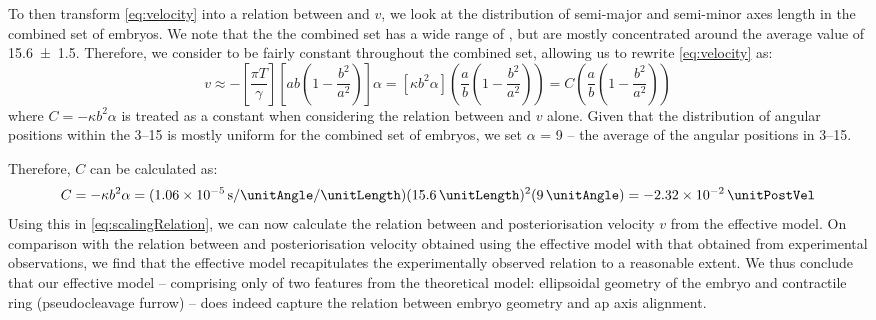 To then transform \eqref{eq:velocity} into a relation between \aspectRatio and $v$, we look at the distribution of semi-major \longAxisLength and semi-minor \shortAxisLength axes length in the combined set of embryos. We note that the the combined set has a wide range of \longAxisLength, but \shortAxisLength are mostly concentrated around the average value of \SI{15.6 +- 1.5}{\unitLength}. Therefore, we consider \shortAxisLength to be fairly constant throughout the combined set, allowing us to rewrite \eqref{eq:velocity} as:
\begin{equation} \label{eq:scalingRelation}
    v \approx - \left[\frac{\pi T}{\gamma}\right] \left[ab\left(1 - \frac{b^2}{a^2}\right)\right]\alpha = [\kappa b^2 \alpha] \left(\frac{a}{b}\left(1 - \frac{b^2}{a^2}\right)\right) = C \left(\frac{a}{b}\left(1 - \frac{b^2}{a^2}\right)\right)
\end{equation}
where $C = -\kappa b^2 \alpha$ is treated as a constant when considering the relation between \aspectRatio and $v$ alone. Given that the distribution of angular positions within the \SIrange{3}{15}{\unitAngle} is mostly uniform for the combined set of embryos, we set $\alpha$ = \SI{9}{\unitAngle} -- the average of the angular positions in \SIrange{3}{15}{\unitAngle}.

Therefore, $C$ can be calculated as:
\begin{equation} \label{eq:scalingConst}
    C = -\kappa b^2 \alpha = (\SI{1.06e-5}{\per\second\per\unitAngle\per\unitLength}) (\SI{15.6}{\unitLength})^2 (\SI{9}{\unitAngle}) = \SI{-2.32e-2}{\unitPostVel}
\end{equation}
Using this in \autoref{eq:scalingRelation}, we can now calculate the relation between \aspectRatio and posteriorisation velocity $v$ from the effective model. On comparison with the relation between \aspectRatio and posteriorisation velocity obtained using the effective model with that obtained from experimental observations, we find that the effective model recapitulates the experimentally observed relation to a reasonable extent. We thus conclude that our effective model -- comprising only of two features from the theoretical model: ellipsoidal geometry of the embryo and contractile ring (pseudocleavage furrow) -- does indeed capture the relation between embryo geometry and \ac{ap} axis alignment. 


